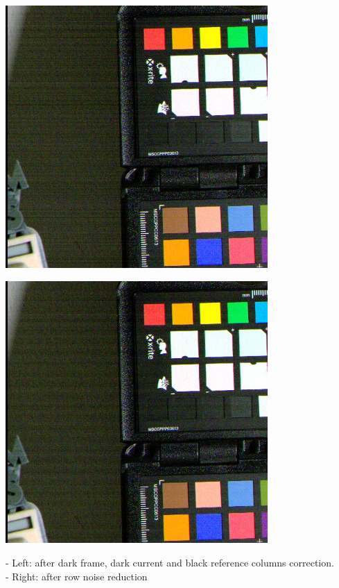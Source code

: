  \begin{center}
\includegraphics[height=10cm]{images/10ms+4-no-blackcol-rn-crop}
\end{center}

\begin{center}
\includegraphics[height=10cm]{images/10ms+4-no-blackcol-ff-crop}
\end{center}

- Left: after dark frame, dark current and black reference columns correction.\\
- Right: after row noise reduction  \\



